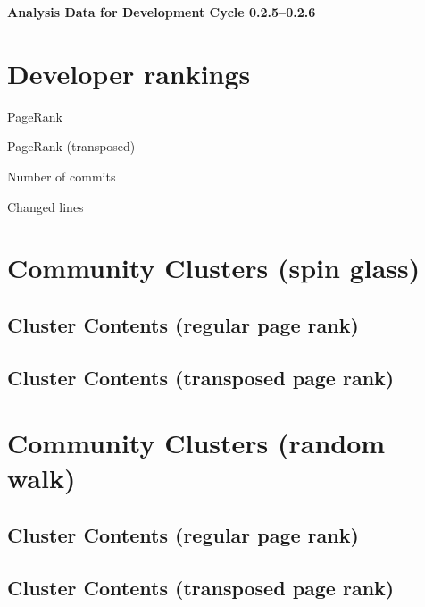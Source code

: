 \documentclass{article}
\begin{document}
\setlength{\parindent}{0pt}
\begin{center}
\begin{Large}
\textbf{Analysis Data for Development Cycle 0.2.5--0.2.6}
\end{Large}
\end{center}
\section{Developer rankings}
\begin{small}\renewcommand{\tabcolsep}{1pt}
\begin{minipage}{0.5\linewidth}
PageRank\\

\end{minipage}%
\begin{minipage}{0.5\linewidth}
PageRank (transposed)\\

\end{minipage}

\renewcommand{\tabcolsep}{5pt}
\begin{minipage}{0.5\linewidth}
Number of commits\\

\end{minipage}%
\begin{minipage}{0.5\linewidth}
Changed lines\\

\end{minipage}
\end{small}
\newpage\section{Community Clusters (spin glass)}
\subsection{Cluster Contents (regular page rank)}
\newpage\subsection{Cluster Contents (transposed page rank)}
\newpage\section{Community Clusters (random walk)}
\subsection{Cluster Contents (regular page rank)}
\newpage\subsection{Cluster Contents (transposed page rank)}
\end{document}
